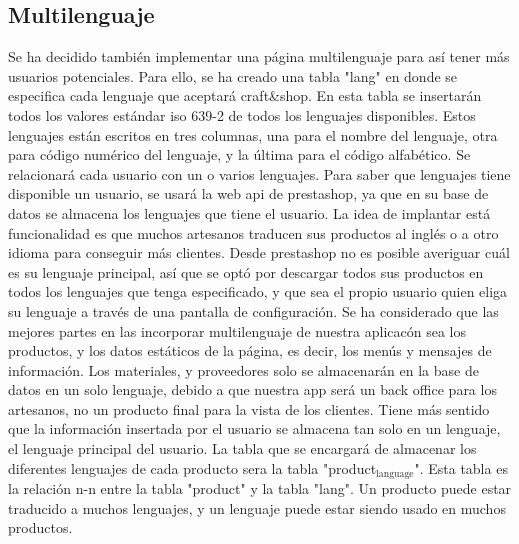 \documentclass[11pt]{article}
\begin{document}
\subsection{Multilenguaje}
\label{sec-2-4}
Se ha decidido también implementar una página multilenguaje para así
tener más usuarios potenciales. Para ello, se ha creado una tabla
"lang" en donde se especifica cada lenguaje que aceptará
craft\&shop. En esta tabla se insertarán todos los valores estándar
iso 639-2 de todos los lenguajes disponibles. Estos lenguajes están
escritos en tres columnas, una para el nombre del lenguaje, otra
para código numérico del lenguaje, y la última para el código
alfabético. Se relacionará cada usuario con un o varios
lenguajes. Para saber que lenguajes tiene disponible un usuario, se
usará la web api de prestashop, ya que en su base de datos se
almacena los lenguajes que tiene el usuario. La idea de implantar
está funcionalidad es que muchos artesanos traducen sus productos al
inglés o a otro idioma para conseguir más clientes. Desde prestashop
no es posible averiguar cuál es su lenguaje principal, así que se
optó por descargar todos sus productos en todos los lenguajes que
tenga especificado, y que sea el propio usuario quien eliga su
lenguaje a través de una pantalla de configuración. Se ha
considerado que las mejores partes en las incorporar multilenguaje
de nuestra aplicacón sea los productos, y los datos estáticos de la
página, es decir, los menús y mensajes de información. Los
materiales, y proveedores solo se almacenarán en la base de datos en
un solo lenguaje, debido a que nuestra app será un back office para los
artesanos, no un producto final para la vista de los clientes. Tiene
más sentido que la información insertada por el usuario se almacena
tan solo en un lenguaje, el lenguaje principal del usuario. La tabla
que se encargará de almacenar los diferentes lenguajes de cada
producto sera la tabla "product$_{\text{language}}$". Esta tabla es la relación
n-n entre la tabla "product" y la tabla "lang". Un producto puede
estar traducido a muchos lenguajes, y un lenguaje puede estar siendo
usado en muchos productos. 
\end{document}
